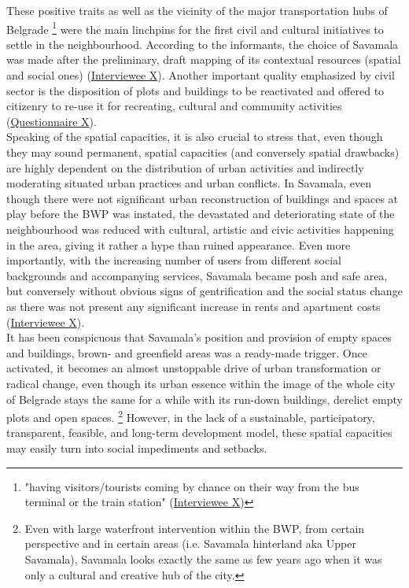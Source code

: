 \documentclass[11pt]{report}
\begin{document}
{These positive traits as well as the vicinity of the major transportation hubs of Belgrade
\footnote{"having visitors/tourists coming by chance on their way from the bus terminal or the train station" (\href{InterviewX}{Interviewee X})}
were the main linchpins for the first civil and cultural initiatives to settle in the neighbourhood. According to the informants, the choice of Savamala was made after the preliminary, draft mapping of its contextual resources (spatial and social ones) (\href{InterviewX}{Interviewee X})}.
Another important quality emphasized by civil sector is the disposition of plots and buildings to be reactivated and offered to citizenry to re-use it for recreating, cultural and community activities (\href{Questionnaire Students Savamala}{Questionnaire X}).
\\

Speaking of the spatial capacities, it is also crucial to stress that, even though they may sound permanent, spatial capacities (and conversely spatial drawbacks) are highly dependent on the distribution of urban activities and indirectly moderating situated urban practices and urban conflicts.
In Savamala, even though there were not significant urban reconstruction of buildings and spaces at play before the BWP was instated, the devastated and deteriorating state of the neighbourhood was reduced with cultural, artistic and civic activities happening in the area, giving it rather a hype than ruined appearance.
Even more importantly, with the increasing number of users from different social backgrounds and accompanying services, Savamala became posh and safe area, but conversely without obvious signs of gentrification and the social status change as there was not present any significant increase in rents and apartment costs 
(\href{InterviewX}{Interviewee X}).
\\

It has been conspicuous that Savamala's position and provision of empty spaces and buildings, brown- and greenfield areas was a ready-made trigger.
Once activated, it becomes an almost unstoppable drive of urban transformation or radical change, even though its urban essence within the image of the whole city of Belgrade stays the same for a while with its run-down buildings, derelict empty plots and open spaces.
\footnote{Even with large waterfront intervention within the BWP, from certain perspective and in certain areas (i.e. Savamala hinterland aka Upper Savamala), Savamala looks exactly the same as few years ago when it was only a cultural and creative hub of the city.}
However, in the lack of a sustainable, participatory, transparent, feasible, and long-term development model, these spatial capacities may easily turn into social impediments and setbacks.
\end{document}
